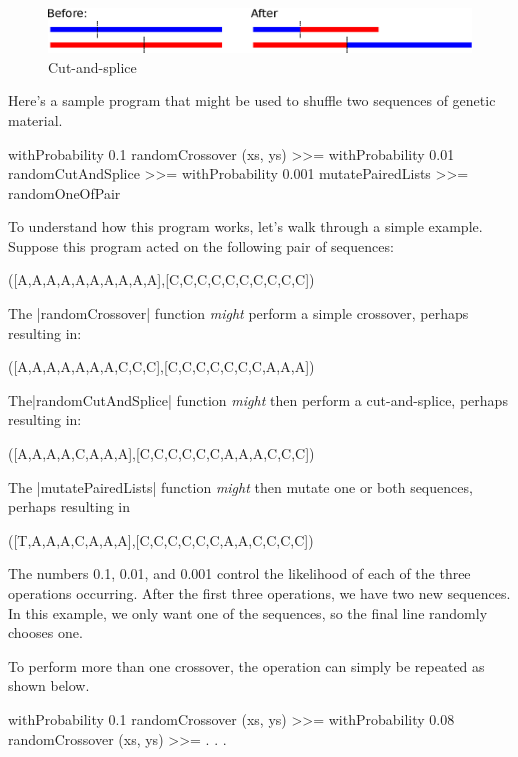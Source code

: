 \documentclass[a4paper,10pt]{report}
\begin{document}
\begin{figure}[hbtp]
 \centering
 \includegraphics[scale=0.7,keepaspectratio=true]{./images/cut-and-splice.eps}
  \caption{Cut-and-splice}
  \label{fig:cut-and-splice}
\end{figure}

Here's a sample program that might be used to shuffle two
sequences of genetic material.

\label{code:recombination}
\begin{code}
    withProbability 0.1 randomCrossover (xs, ys) >>=
    withProbability 0.01 randomCutAndSplice >>=
    withProbability 0.001 mutatePairedLists >>=
    randomOneOfPair
\end{code} 

To understand how this program works,
let's walk through a simple example.
Suppose this program acted on the following pair of sequences:
\begin{code}
([A,A,A,A,A,A,A,A,A,A],[C,C,C,C,C,C,C,C,C,C])
\end{code} 
The |randomCrossover| function \emph{might} perform a simple crossover,
perhaps resulting in:
\begin{code}
([A,A,A,A,A,A,A,C,C,C],[C,C,C,C,C,C,C,A,A,A])
\end{code} 
The|randomCutAndSplice| function \emph{might} then perform a cut-and-splice, perhaps
resulting in:
\begin{code}
([A,A,A,A,C,A,A,A],[C,C,C,C,C,C,A,A,A,C,C,C])
\end{code} 
The |mutatePairedLists| function \emph{might} then mutate one or both sequences, perhaps
resulting in
\begin{code}
([T,A,A,A,C,A,A,A],[C,C,C,C,C,C,A,A,C,C,C,C])
\end{code} 
The numbers 0.1, 0.01, and 0.001 control the likelihood of each
of the three operations occurring.
After the first three operations, we have two new sequences.
In this example, we only want one of the sequences,
so the final line randomly chooses one.

To perform more than one crossover, the operation can simply be repeated
as shown below.

\begin{code}
    withProbability 0.1 randomCrossover (xs, ys) >>=
    withProbability 0.08 randomCrossover (xs, ys) >>=
    . . .
\end{code} 
\end{document}
